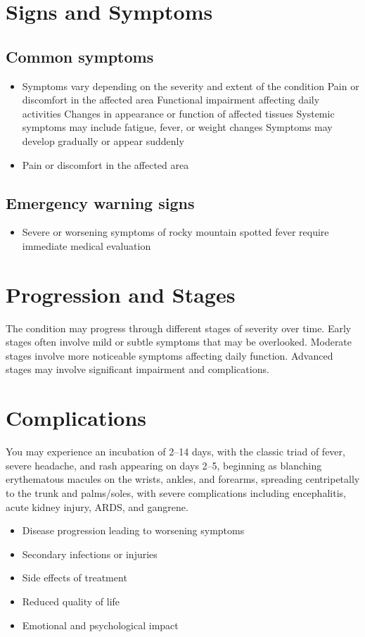 \section{Signs and Symptoms}

\subsection{Common symptoms}
\begin{itemize}[noitemsep]
  \item Symptoms vary depending on the severity and extent of the condition Pain or discomfort in the affected area Functional impairment affecting daily activities Changes in appearance or function of affected tissues Systemic symptoms may include fatigue, fever, or weight changes Symptoms may develop gradually or appear suddenly
  \item Pain or discomfort in the affected area
  \end{itemize}

\subsection{Emergency warning signs}
\begin{itemize}[noitemsep]
  \item Severe or worsening symptoms of rocky mountain spotted fever require immediate medical evaluation
\end{itemize}
\section{Progression and Stages}
The condition may progress through different stages of severity over time. Early stages often involve mild or subtle symptoms that may be overlooked. Moderate stages involve more noticeable symptoms affecting daily function. Advanced stages may involve significant impairment and complications.
\section{Complications}
You may experience an incubation of 2--14 days, with the classic triad of fever, severe headache, and rash appearing on days 2--5, beginning as blanching erythematous macules on the wrists, ankles, and forearms, spreading centripetally to the trunk and palms/soles, with severe complications including encephalitis, acute kidney injury, ARDS, and gangrene.

\begin{itemize}[noitemsep]
  \item Disease progression leading to worsening symptoms
  \item Secondary infections or injuries
  \item Side effects of treatment
  \item Reduced quality of life
  \item Emotional and psychological impact
\end{itemize}
